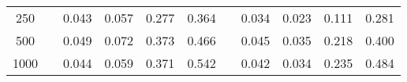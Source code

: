 % 
\begin{tabular}{ccccccccccc}
  \hline
  \hline
250 &  & 0.043 & 0.057 & 0.277 & 0.364 &  & 0.034 & 0.023 & 0.111 & 0.281 \\ 
  500 &  & 0.049 & 0.072 & 0.373 & 0.466 &  & 0.045 & 0.035 & 0.218 & 0.400 \\ 
  1000 &  & 0.044 & 0.059 & 0.371 & 0.542 &  & 0.042 & 0.034 & 0.235 & 0.484 \\ 
   \hline
\end{tabular}
